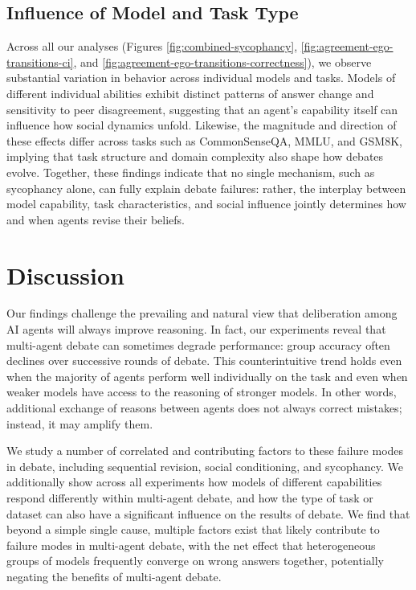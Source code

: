 \documentclass{article}
\begin{document}
\subsection{Influence of Model and Task Type}

Across all our analyses (Figures \ref{fig:combined-sycophancy}, \ref{fig:agreement-ego-transitions-ci}, and \ref{fig:agreement-ego-transitions-correctness}), we observe substantial variation in behavior across individual models and tasks. Models of different individual abilities exhibit distinct patterns of answer change and sensitivity to peer disagreement, suggesting that an agent's capability itself can influence how social dynamics unfold. Likewise, the magnitude and direction of these effects differ across tasks such as CommonSenseQA, MMLU, and GSM8K, implying that task structure and domain complexity also shape how debates evolve. Together, these findings indicate that no single mechanism, such as sycophancy alone, can fully explain debate failures: rather, the interplay between model capability, task characteristics, and social influence jointly determines how and when agents revise their beliefs.

\section{Discussion}
\label{sec:discussion}

Our findings challenge the prevailing and natural view that deliberation among AI agents will always improve reasoning. In fact, our experiments reveal that multi-agent debate can sometimes degrade performance: group accuracy often declines over successive rounds of debate. This counterintuitive trend holds even when the majority of agents perform well individually on the task and even when weaker models have access to the reasoning of stronger models. In other words, additional exchange of reasons between agents does not always correct mistakes; instead, it may amplify them.

We study a number of correlated and contributing factors to these failure modes in debate, including sequential revision, social conditioning, and sycophancy. We additionally show across all experiments how models of different capabilities respond differently within multi-agent debate, and how the type of task or dataset can also have a significant influence on the results of debate. We find that beyond a simple single cause, multiple factors exist that likely contribute to failure modes in multi-agent debate, with the net effect that heterogeneous groups of models frequently converge on wrong answers together, potentially negating the benefits of multi-agent debate. 
\end{document}

